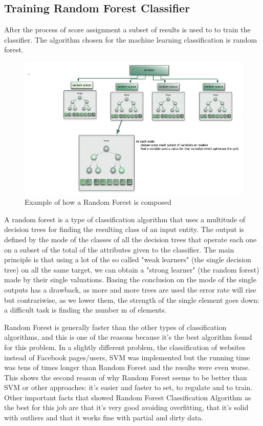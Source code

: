\subsection{Training Random Forest Classifier}

After the process of score assignment a subset of results is used to to train the classifier. The algorithm chosen for the machine learning classification is random forest.

\begin{figure}
\centering
    \includegraphics[width=\columnwidth]{img/random_forest_small.jpg}
    \caption{Example of how a Random Forest is composed}
    \label{Fig.4}
\end{figure}

A random forest is a type of classification algorithm that uses a multitude of decision trees for finding the resulting class of an input entity. The output is defined by the mode of the classes of all the decision trees that operate each one on a subset of the total of the attributes given to the classifier. The main principle is that using a lot of the so called "weak learners" (the single decision tree) on all the same target, we can obtain a "strong learner" (the random forest) made by their single valuations. Basing the conclusion on the mode of the single outputs has a drawback, as more and more trees are used the error rate will rise but contrariwise, as we lower them, the strength of the single element goes down: a difficult task is finding the number m of elements.

Random Forest is generally faster than the other types of classification algorithms, and this is one of the reasons because it's the best algorithm found for this problem\cite{randomforestart}. In a slightly different problem, the classification of websites instead of Facebook pages/users, SVM was implemented but the running time was tens of times longer than Random Forest and the results were even worse. This shows the second reason of why Random Forest seems to be better than SVM or other approaches: it's easier and faster to set, to regulate and to train.
Other important facts that showed Random Forest Classification Algorithm as the best for this job are that it's very good avoiding overfitting, that it's solid with outliers and that it works fine with partial and dirty data.

